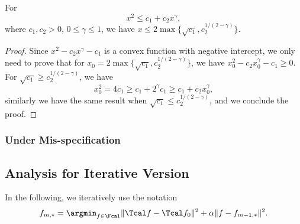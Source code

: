 \documentclass[12pt]{extarticle} %
\begin{document}
\begin{lemma}\label{lem:aux-1}
    For $$
    x^2 \leq c_1 + c_2 x^\gamma,
    $$
    where $c_1, c_2>0$, $0\leq\gamma\leq 1$, we have $x \leq 2 \max\big\{\sqrt{c_1}, c_2^{1/(2-\gamma)}\big\}$. 
\end{lemma}
\begin{proof}
   Since $x^2 - c_2 x^\gamma -c_1$ is a convex function with negative intercept, we only need to prove that for $x_0 = 2 \max\{\sqrt{c_1}, c_2^{1/(2-\gamma)}\}$, we have $x_0^2 - c_2 x_0^\gamma -c_1 \geq 0$. For $\sqrt{c_1} \geq c_2^{1/(2-\gamma)}$, we have $$
   x_0^2 = 4c_1 \geq c_1 + 2^\gamma c_1 \geq c_1+ c_2 x_0^\gamma,
   $$
   similarly we have the same result when $\sqrt{c_1} \leq c_2^{1/(2-\gamma)}$,
   and we conclude the proof.
\end{proof}

\subsubsection{Under Mis-specification}


\subsection{Analysis for Iterative Version}
In the following, we iteratively use the notation \begin{align}\label{eq:iter-tikh}
    f_{m,*} = \argmin_{f\in\Fcal} \|\Tcal f - \Tcal f_0\|^2 + \alpha \|f - f_{m-1,*}\|^2.
\end{align}
\end{document}
